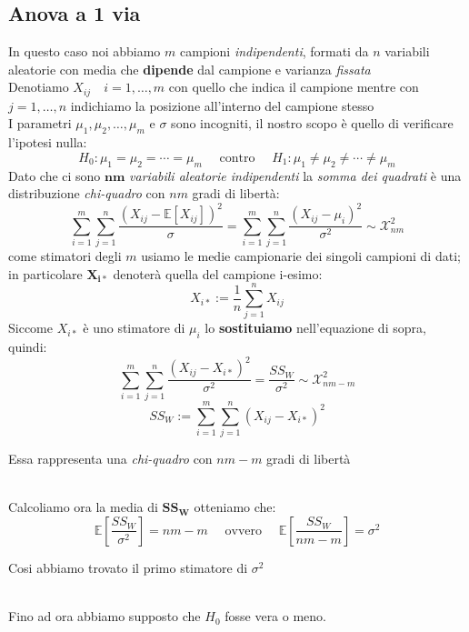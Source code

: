 \documentclass[]{article}
\newcommand{\ev}{\mathbb{E}[X]}
\renewcommand{\ev}[1]{\mathbb{E}\left[#1\right]}
\begin{document}
    \subsection{Anova a 1 via}
    In questo caso noi abbiamo $m$ campioni \textit{indipendenti}, formati da $n$ variabili aleatorie con media che \textbf{dipende} dal campione e varianza \textit{fissata} \\
    Denotiamo $X_{ij} \quad i = 1,\ldots, m$ con quello che indica il campione mentre con $j=1, \ldots, n$ indichiamo la posizione all'interno del campione stesso \\[2ex] 
    I parametri $\mu_1, \mu_2, \ldots, \mu_m$ e $\sigma$ sono incogniti, il nostro scopo è quello di verificare l'ipotesi nulla:
    \[ H_0 : \mu_1 = \mu_2 = \cdots = \mu_m \quad \text{ contro } \quad H_1 : \mu_1 \not= \mu_2 \not= \cdots \not= \mu_m \]
    Dato che ci sono $\boldsymbol{nm}$ \textit{variabili aleatorie indipendenti} la \textit{somma dei quadrati} è una distribuzione \textit{chi-quadro} con $nm$ gradi di libertà:
    \[ \sum_{i=1}^{m} \sum_{j=1}^{n} \frac{(X_{ij} - \ev{X_{ij}})^2}{\sigma} = \sum_{i=1}^{m} \sum_{j=1}^{n} \frac{(X_{ij} - \mu_i)^2}{\sigma^2} \sim \mathcal{X}^2_{nm} \]
    come stimatori degli $m$ usiamo le medie campionarie dei singoli campioni di dati; in particolare $\boldsymbol{X_{i*}}$ denoterà quella del campione i-esimo:
    \[ X_{i*} := \frac{1}{n} \sum_{j=1}^{n} X_{ij} \]
    Siccome $X_{i*}$ è uno stimatore di $\mu_i$ lo \textbf{sostituiamo} nell'equazione di sopra, quindi:
    \[ \sum_{i=1}^{m} \sum_{j=1}^{n} \frac{(X_{ij} - X_{i*})^2}{\sigma^2} = \frac{SS_W}{\sigma^2} \sim \mathcal{X}^2_{nm - m} \]
    $$ SS_W := \sum_{i=1}^m\sum_{j=1}^n(X_{ij}-X_{i*})^2 $$
    \centerline{Essa rappresenta una \textit{chi-quadro} con $nm-m$ gradi di libertà} \\[2ex]
    Calcoliamo ora la media di $\boldsymbol{SS_W}$ otteniamo che:\
    \[ \ev{\frac{SS_W}{\sigma^2}} = nm - m \quad \text{ ovvero } \quad \ev{\frac{SS_W}{nm-m}} = \sigma^2 \]
    \centerline{Cosi abbiamo trovato il primo stimatore di $\sigma^2$} \\[2ex]
    Fino ad ora abbiamo supposto che $H_0$ fosse vera o meno.
\end{document}

